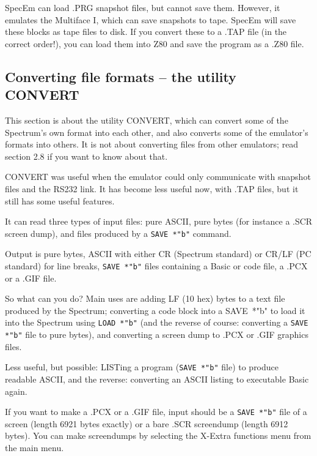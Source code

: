     SpecEm can load .PRG snapshot files, but cannot save them.  However, it
    emulates the Multiface I, which can save snapshots to tape.  SpecEm will
    save these blocks as tape files to disk.  If you convert these to a .TAP
    file (in the correct order!), you can load them into Z80 and save the
    program as a .Z80 file.



\subsection{Converting file formats -- the utility CONVERT}

    This section is about the utility CONVERT, which can convert some of the
    Spectrum's own format into each other, and also converts some of the
    emulator's formats into others.  It is not about converting files from
    other emulators; read section 2.8 if you want to know about that.

    CONVERT was useful when the emulator could only communicate with
    snapshot files and the RS232 link.  It has become less useful now, with
    .TAP files, but it still has some useful features.

    It can read three types of input files: pure ASCII, pure bytes (for
    instance a .SCR screen dump), and files produced by a \verb|SAVE *"b"|
    command.

    Output is pure bytes, ASCII with either CR (Spectrum standard) or CR/LF
    (PC standard) for line breaks, \verb|SAVE *"b"| files containing a Basic or
    code file, a .PCX or a .GIF file.

    So what can you do? Main uses are adding LF (10 hex) bytes to a text
    file produced by the Spectrum; converting a code block into a SAVE~*"b"
    to load it into the Spectrum using \verb|LOAD *"b"|
    (and the reverse of course: converting a
    \verb|SAVE *"b"| file to pure bytes), and converting a screen dump
    to .PCX or .GIF graphics files.

    Less useful, but possible: LISTing a program (\verb|SAVE *"b"| file)
    to produce readable ASCII, and the reverse: converting an ASCII listing to
    executable Basic again.

    If you want to make a .PCX or a .GIF file, input should be a
    \verb|SAVE *"b"|
    file of a screen (length 6921 bytes exactly) or a bare .SCR screendump
    (length 6912 bytes).  You can make screendumps by selecting the X-Extra
    functions menu from the main menu.



